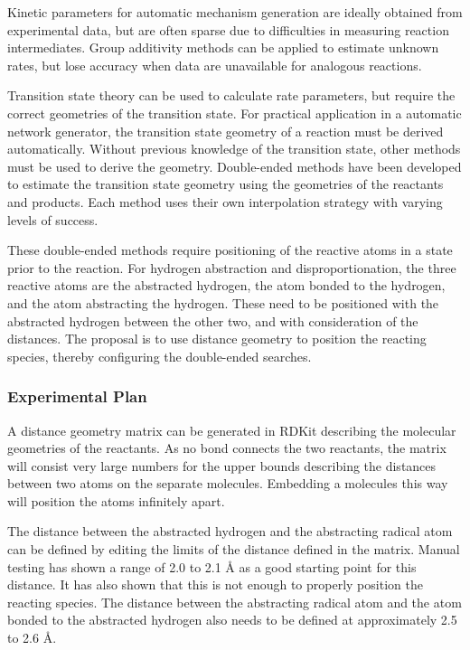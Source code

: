\documentclass[12pt]{article}
\begin{document}
Kinetic parameters for automatic mechanism generation are ideally obtained from experimental data, but are often sparse due to difficulties in measuring reaction intermediates. Group additivity methods can be applied to estimate unknown rates, but lose accuracy when data are unavailable for analogous reactions.

Transition state theory can be used to calculate rate parameters, but require the correct geometries of the transition state. For practical application in a automatic network generator, the transition state geometry of a reaction must be derived automatically. Without previous knowledge of the transition state, other methods must be used to derive the geometry. Double-ended methods have been developed to estimate the transition state geometry using the geometries of the reactants and products. Each method uses their own interpolation strategy with varying levels of success.

These double-ended methods require positioning of the reactive atoms in a state prior to the reaction. For hydrogen abstraction and disproportionation, the three reactive atoms are the abstracted hydrogen, the atom bonded to the hydrogen, and the atom abstracting the hydrogen. These need to be positioned with the abstracted hydrogen between the other two, and with consideration of the distances. The proposal is to use distance geometry to position the reacting species, thereby configuring the double-ended searches.

\subsubsection{Experimental Plan}

A distance geometry matrix can be generated in RDKit describing the molecular geometries of the reactants. As no bond connects the two reactants, the matrix will consist very large numbers for the upper bounds describing the distances between two atoms on the separate molecules. Embedding a molecules this way will position the atoms infinitely apart.

The distance between the abstracted hydrogen and the abstracting radical atom can be defined by editing the limits of the distance defined in the matrix. Manual testing has shown a range of 2.0 to 2.1 {\AA} as a good starting point for this distance. It has also shown that this is not enough to properly position the reacting species. The distance between the abstracting radical atom and the atom bonded to the abstracted hydrogen also needs to be defined at approximately 2.5 to 2.6 {\AA}.
\end{document}
